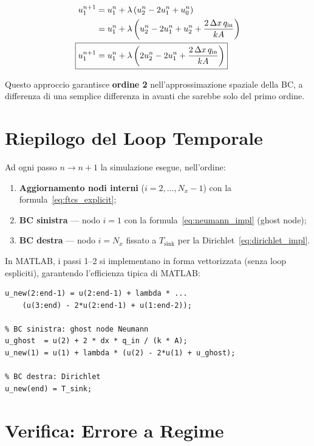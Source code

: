 \documentclass[11pt, a4paper]{article}
\begin{document}
\begin{align}
  u_1^{n+1} &= u_1^n + \lambda \left( u_2^n - 2u_1^n + u_0^n \right) \notag\\
             &= u_1^n + \lambda \left( u_2^n - 2u_1^n + u_2^n + \frac{2\,\Delta x\, q_\text{in}}{k A} \right) \notag\\
  \Aboxed{u_1^{n+1} &= u_1^n + \lambda \left( 2u_2^n - 2u_1^n + \frac{2\,\Delta x\, q_\text{in}}{k A} \right)}
  \label{eq:neumann_impl}
\end{align}

Questo approccio garantisce \textbf{ordine 2} nell'approssimazione spaziale della BC, a differenza di una semplice differenza in avanti che sarebbe solo del primo ordine.

\section{Riepilogo del Loop Temporale}

Ad ogni passo $n \to n+1$ la simulazione esegue, nell'ordine:

\begin{enumerate}
  \item \textbf{Aggiornamento nodi interni} ($i = 2, \ldots, N_x-1$) con la formula~\eqref{eq:ftcs_explicit};
  \item \textbf{BC sinistra} — nodo $i=1$ con la formula~\eqref{eq:neumann_impl} (ghost node);
  \item \textbf{BC destra} — nodo $i=N_x$ fissato a $T_\text{sink}$ per la Dirichlet~\eqref{eq:dirichlet_impl}.
\end{enumerate}

In MATLAB, i passi 1--2 si implementano in forma vettorizzata (senza loop espliciti), garantendo l'efficienza tipica di MATLAB:

\begin{lstlisting}[style=matlab, caption={Kernel del loop temporale in MATLAB}]
% Nodi interni (FTCS)
u_new(2:end-1) = u(2:end-1) + lambda * ...
    (u(3:end) - 2*u(2:end-1) + u(1:end-2));

% BC sinistra: ghost node Neumann
u_ghost  = u(2) + 2 * dx * q_in / (k * A);
u_new(1) = u(1) + lambda * (u(2) - 2*u(1) + u_ghost);

% BC destra: Dirichlet
u_new(end) = T_sink;
\end{lstlisting}

\section{Verifica: Errore a Regime}
\end{document}
